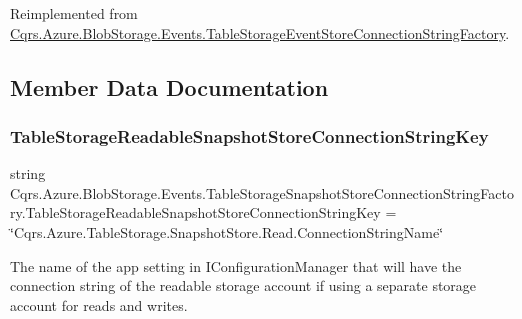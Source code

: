 Reimplemented from \hyperlink{classCqrs_1_1Azure_1_1BlobStorage_1_1Events_1_1TableStorageEventStoreConnectionStringFactory_a07406c2607bdd42dd13116b92fc6b665_a07406c2607bdd42dd13116b92fc6b665}{Cqrs.\+Azure.\+Blob\+Storage.\+Events.\+Table\+Storage\+Event\+Store\+Connection\+String\+Factory}.



\subsection{Member Data Documentation}
\mbox{\label{classCqrs_1_1Azure_1_1BlobStorage_1_1Events_1_1TableStorageSnapshotStoreConnectionStringFactory_add2ff350d26fed88d8c18737d3895663_add2ff350d26fed88d8c18737d3895663}} 
\subsubsection{\texorpdfstring{Table\+Storage\+Readable\+Snapshot\+Store\+Connection\+String\+Key}{TableStorageReadableSnapshotStoreConnectionStringKey}}
{\footnotesize\ttfamily string Cqrs.\+Azure.\+Blob\+Storage.\+Events.\+Table\+Storage\+Snapshot\+Store\+Connection\+String\+Factory.\+Table\+Storage\+Readable\+Snapshot\+Store\+Connection\+String\+Key = \char`\"{}Cqrs.\+Azure.\+Table\+Storage.\+Snapshot\+Store.\+Read.\+Connection\+String\+Name\char`\"{}\hspace{0.3cm}{\ttfamily [static]}}



The name of the app setting in I\+Configuration\+Manager that will have the connection string of the readable storage account if using a separate storage account for reads and writes. 

